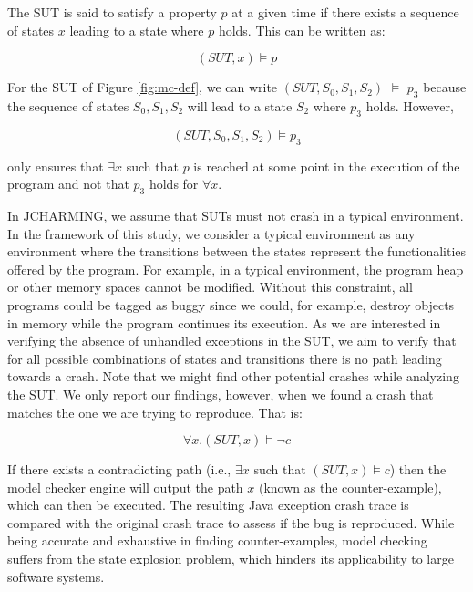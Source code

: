 \documentclass[12pt]{report}
\begin{document}
The SUT is said to satisfy a property \(p\) at a given time if there
exists a sequence of states \(x\) leading to a state where \(p\) holds.
This can be written as:

\begin{equation}
(SUT, x) \models p
\end{equation}

For the SUT of Figure \ref{fig:mc-def}, we can write
\((SUT, {S_0, S_1, S_2})\) \(\models\) \(p_3\) because the sequence of
states \({S_0, S_1, S_2}\) will lead to a state \(S_2\) where \(p_3\)
holds. However,

\begin{equation}
(SUT, S_0, S_1, S_2) \models p_3
\end{equation}

only ensures that \(\exists x\) such that \(p\) is reached at some point
in the execution of the program and not that \(p_3\) holds for
\(\forall x\).

In JCHARMING, we assume that SUTs must not crash in a typical
environment. In the framework of this study, we consider a typical
environment as any environment where the transitions between the states
represent the functionalities offered by the program. For example, in a
typical environment, the program heap or other memory spaces cannot be
modified. Without this constraint, all programs could be tagged as buggy
since we could, for example, destroy objects in memory while the program
continues its execution. As we are interested in verifying the absence
of unhandled exceptions in the SUT, we aim to verify that for all
possible combinations of states and transitions there is no path leading
towards a crash. Note that we might find other potential crashes while
analyzing the SUT. We only report our findings, however, when we found a
crash that matches the one we are trying to reproduce. That is:

\begin{equation}
\forall x.(SUT, x) \models \neg c
\end{equation}

If there exists a contradicting path (i.e., \(\exists x\) such that
\((SUT, x) \models c\)) then the model checker engine will output the
path \(x\) (known as the counter-example), which can then be executed.
The resulting Java exception crash trace is compared with the original
crash trace to assess if the bug is reproduced. While being accurate and
exhaustive in finding counter-examples, model checking suffers from the
state explosion problem, which hinders its applicability to large
software systems.
\end{document}
